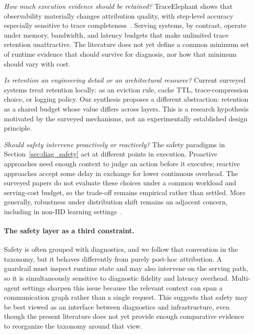 \emph{How much execution evidence should be retained?} TraceElephant shows that observability materially changes attribution quality, with step-level accuracy especially sensitive to trace completeness~\cite{traceelephant2026}. Serving systems, by contrast, operate under memory, bandwidth, and latency budgets that make unlimited trace retention unattractive. The literature does not yet define a common minimum set of runtime evidence that should survive for diagnosis, nor how that minimum should vary with cost.

\emph{Is retention an engineering detail or an architectural resource?} Current surveyed systems treat retention locally: as an eviction rule, cache TTL, trace-compression choice, or logging policy. Our synthesis proposes a different abstraction: retention as a shared budget whose value differs across layers. This is a research hypothesis motivated by the surveyed mechanisms, not an experimentally established design principle.

\emph{Should safety intervene proactively or reactively?} The safety paradigms in Section~\ref{sec:diag_safety} act at different points in execution. Proactive approaches need enough context to judge an action before it executes; reactive approaches accept some delay in exchange for lower continuous overhead. The surveyed papers do not evaluate these choices under a common workload and serving-cost budget, so the trade-off remains empirical rather than settled. More generally, robustness under distribution shift remains an adjacent concern, including in non-IID learning settings~\cite{chen2024confusion}.

\paragraph*{The safety layer as a third constraint.}
Safety is often grouped with diagnostics, and we follow that convention in the taxonomy, but it behaves differently from purely post-hoc attribution. A guardrail must inspect runtime state and may also intervene on the serving path, so it is simultaneously sensitive to diagnostic fidelity and latency overhead. Multi-agent settings sharpen this issue because the relevant context can span a communication graph rather than a single request. This suggests that safety may be best viewed as an interface between diagnostics and infrastructure, even though the present literature does not yet provide enough comparative evidence to reorganize the taxonomy around that view.

